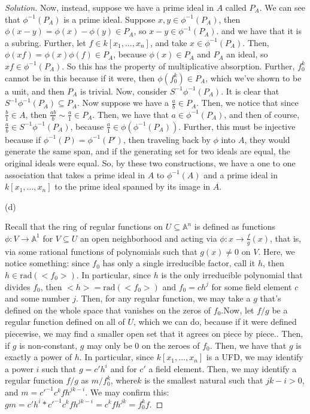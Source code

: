 \documentclass[10pt]{article}
\begin{document}
\begin{proof}[Solution]
Now, instead, suppose we have a prime ideal in $A$ called $P_A$. We can see that $\phi^{-1}(P_A)$ is a prime ideal. Suppose $x,y \in \phi^{-1}(P_A)$, then $\phi(x-y) = \phi(x) - \phi(y) \in P_A$, so $x-y \in \phi^{-1}(P_A)$. and we have that it is a subring. Further, let $f \in k[x_1,...,x_n]$, and take $x \in \phi^{-1}(P_A)$. Then, $\phi(xf) = \phi(x) \phi(f) \in P_A$, because $\phi(x) \in P_A$ and $P_A$ an ideal, so $xf \in \phi^{-1}(P_A)$. So this has the property of multiplicative absorption. Further, $f_0^k$ cannot be in this because if it were, then $\phi(f_0^k) \in P_A$, which we've shown to be a unit, and then $P_A$ is trivial. Now, consider $S^{-1}\phi^{-1}(P_A)$. It is clear that $S^{-1}\phi^{-1}(P_A) \subseteq P_A$. Now suppose we have a $\frac{a}{b} \in P_A$. Then, we notice that since $\frac{b}{1} \in A$, then $\frac{ab}{b} \sim \frac{a}{1} \in P_A$. Then, we have that $a \in \phi^{-1}(P_A)$, and then of course, $\frac{a}{b} \in S^{-1}\phi^{-1}(P_A)$, because $\frac{a}{1} \in \phi( \phi^{-1}(P_A))$. Further, this must be injective because if $\phi^{-1}(P) = \phi^{-1}(P')$, then traveling back by $\phi$ into $A$, they would generate the same span, and if the generating set for two ideals are equal, the original ideals were equal. So, by these two constructions, we have a one to one association that takes a prime ideal in $A$ to $\phi^{-1}(A)$ and a prime ideal in $k[x_1,...,x_n]$ to the prime ideal spanned by its image in $A$.

(d)

Recall that the ring of regular functions on $U \subseteq \mathbb{A}^n$ is defined as functions $\phi: V \to \mathbb{A}^1$ for $V \subseteq U$ an open neighborhood and acting via $\phi: x \to \frac{f}{g}(x)$, that is, via some rational functions of polynomials such that $g(x) \not = 0$ on $V$. Here, we notice something: since $f_0$ has only a single irreducible factor, call it $h$, then $h \in \text{rad}(<f_0>)$. In particular, since $h$ is the only irreducible polynomial that divides $f_0$, then $<h> = \text{rad}(<f_0>)$ and $f_0 = c h^j$ for some field element $c$ and some number $j$. Then, for any regular function, we may take a $g$ that's defined on the whole space that vanishes on the zeros of $f_0$.Now, let $f/g$ be a regular function defined on all of $U$, which we can do, because if it were defined piecewise, we may find a smaller open set that it agrees on piece by piece.. Then, if $g$ is non-constant, $g$ may only be $0$ on the zeroes of $f_0$. Then, we have that $g$ is exactly a power of $h$. In particular, since $k[x_1,...,x_n]$ is a UFD, we may identify a power $i$ such that $g = c'h^i$ and for $c'$ a field element. Then, we may identify a regular function $f/g$ as $m/f_0^k$, where$k$ is the smallest natural such that $jk - i > 0$, and $m = c'^{-1}c^k f h^{jk - i}$. We may confirm this: $gm = c'h^{i} * c'^{-1}c^k f h^{jk -i} = c^kfh^{jk} = f_0^k f$. 
 

\end{proof}
\end{document}

